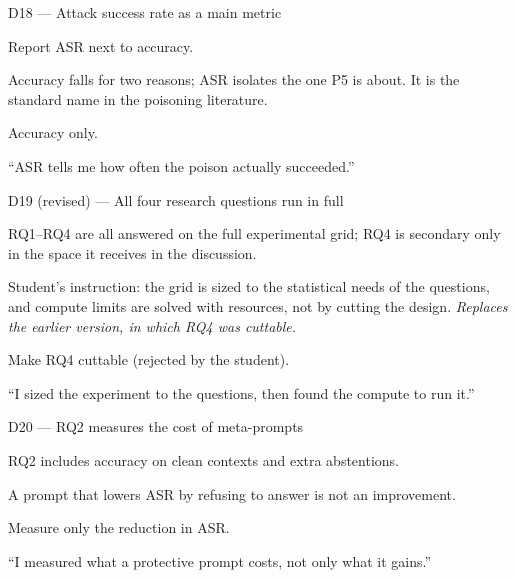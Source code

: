 \documentclass[11pt,a4paper]{report}
\begin{document}
\begin{decisionbox}{D18 --- Attack success rate as a main metric}
\begin{description}[nosep, leftmargin=0pt]
  \item[Decision.] Report ASR next to accuracy.
  \item[Why.] Accuracy falls for two reasons; ASR isolates the one P5 is
    about. It is the standard name in the poisoning literature.
  \item[Alternatives.] Accuracy only.
  \item[Interview line.] ``ASR tells me how often the poison actually
    succeeded.''
\end{description}
\end{decisionbox}

\begin{decisionbox}{D19 (revised) --- All four research questions run in full}
\begin{description}[nosep, leftmargin=0pt]
  \item[Decision.] RQ1--RQ4 are all answered on the full experimental grid;
    RQ4 is secondary only in the space it receives in the discussion.
  \item[Why.] Student's instruction: the grid is sized to the statistical
    needs of the questions, and compute limits are solved with resources,
    not by cutting the design. \emph{Replaces the earlier version, in which
    RQ4 was cuttable.}
  \item[Alternatives.] Make RQ4 cuttable (rejected by the student).
  \item[Interview line.] ``I sized the experiment to the questions, then
    found the compute to run it.''
\end{description}
\end{decisionbox}

\begin{decisionbox}{D20 --- RQ2 measures the cost of meta-prompts}
\begin{description}[nosep, leftmargin=0pt]
  \item[Decision.] RQ2 includes accuracy on clean contexts and extra
    abstentions.
  \item[Why.] A prompt that lowers ASR by refusing to answer is not an
    improvement.
  \item[Alternatives.] Measure only the reduction in ASR.
  \item[Interview line.] ``I measured what a protective prompt costs, not
    only what it gains.''
\end{description}
\end{decisionbox}
\end{document}
